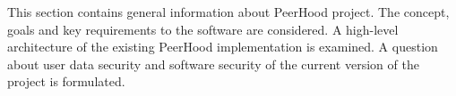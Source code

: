 %
%
This section contains general information about PeerHood project. 
%
The concept, goals and key requirements to the software are considered. 
%
A high-level architecture of the existing PeerHood implementation is examined. 
%
A question about user data security and software security of the current version of the project is formulated. 